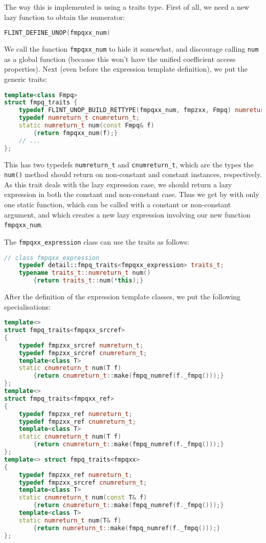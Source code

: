 \documentclass[a4paper,10pt]{book}
\newcommand{\code}{\lstinline}
\begin{document}
{{The way this is implemented is using a traits type. First of all, we need a new
lazy function to obtain the numerator:

\begin{lstlisting}[language=c++]
FLINT_DEFINE_UNOP(fmpqxx_num)
\end{lstlisting}

We call the function \code{fmpqxx_num} to hide it somewhat, and discourage
calling \code{num} as a global function (because this won't have the unified
coefficient access properties). Next (even before the expression template
definition), we put the generic traits:

\begin{lstlisting}[language=c++]
template<class Fmpq>
struct fmpq_traits {
    typedef FLINT_UNOP_BUILD_RETTYPE(fmpqxx_num, fmpzxx, Fmpq) numreturn_t;
    typedef numreturn_t cnumreturn_t;
    static numreturn_t num(const Fmpq& f)
        {return fmpqxx_num(f);}
    // ...
};
\end{lstlisting}

This has two typedefs \code{numreturn_t} and \code{cnumreturn_t}, which are the
types the \code{num()} method should return on non-constant and constant
instances, respectively. As this trait deals with the lazy expression case, we
should return a lazy expression in both the constant and non-constant case. Thus
we get by with only one static function, which can be called with a constant or
non-constant argument, and which creates a new lazy expression involving our new
function \code{fmpqxx_num}.

The \code{fmpqxx_expression} class can use the traits as follows:

\begin{lstlisting}[language=c++]
// class fmpqxx_expression
    typedef detail::fmpq_traits<fmpqxx_expression> traits_t;
    typename traits_t::numreturn_t num()
        {return traits_t::num(*this);}
\end{lstlisting}

After the definition of the expression template classes, we put the following
specialisations:

\begin{lstlisting}[language=c++]
template<>
struct fmpq_traits<fmpqxx_srcref>
{
    typedef fmpzxx_srcref numreturn_t;
    typedef fmpzxx_srcref cnumreturn_t;
    template<class T>
    static cnumreturn_t num(T f)
        {return cnumreturn_t::make(fmpq_numref(f._fmpq()));}
};
template<>
struct fmpq_traits<fmpqxx_ref>
{
    typedef fmpzxx_ref numreturn_t;
    typedef fmpzxx_ref cnumreturn_t;
    template<class T>
    static cnumreturn_t num(T f)
        {return cnumreturn_t::make(fmpq_numref(f._fmpq()));}
};
template<> struct fmpq_traits<fmpqxx>
{
    typedef fmpzxx_ref numreturn_t;
    typedef fmpzxx_srcref cnumreturn_t;
    template<class T>
    static cnumreturn_t num(const T& f)
        {return cnumreturn_t::make(fmpq_numref(f._fmpq()));}
    template<class T>
    static numreturn_t num(T& f)
        {return numreturn_t::make(fmpq_numref(f._fmpq()));}
};
\end{lstlisting}

}}
\end{document}
